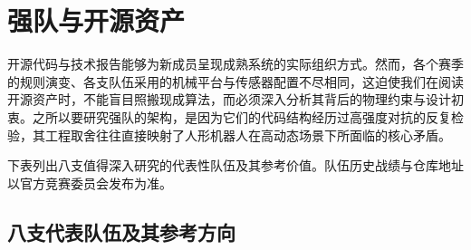 \section{强队与开源资产}

开源代码与技术报告能够为新成员呈现成熟系统的实际组织方式。然而，各个赛季的规则演变、各支队伍采用的机械平台与传感器配置不尽相同，这迫使我们在阅读开源资产时，不能盲目照搬现成算法，而必须深入分析其背后的物理约束与设计初衷。之所以要研究强队的架构，是因为它们的代码结构经历过高强度对抗的反复检验，其工程取舍往往直接映射了人形机器人在高动态场景下所面临的核心矛盾。\official

下表列出八支值得深入研究的代表性队伍及其参考价值。队伍历史战绩与仓库地址以官方竞赛委员会发布为准。

\subsection{八支代表队伍及其参考方向}

